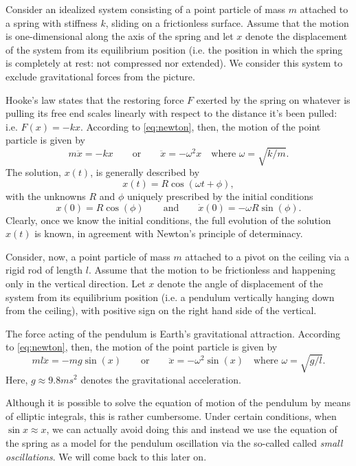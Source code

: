\documentclass[english,fontsize=11pt,paper=a5,oneside]{scrbook}
\theoremstyle{definition}
\newenvironment{example}
  {\pushQED{\qed}\renewcommand{\qedsymbol}{$\lozenge$}\examplex}
  {\popQED\endexamplex}
\begin{document}
\begin{example}[horizontal spring and pendulum]\label{ex:sprPen}

    Consider an idealized system consisting of a point particle of mass $m$ attached to a spring with stiffness $k$, sliding on a frictionless surface.
    Assume that the motion is one-dimensional along the axis of the spring and let $x$ denote the displacement of the system from its equilibrium position (i.e. the position in which the spring is completely at rest: not compressed nor extended). We consider this system to exclude gravitational forces from the picture.
    
    Hooke's law states that the restoring force $F$ exerted by the spring on whatever is pulling its free end scales linearly with respect to the distance it's been pulled: i.e. $F(x) = - k x$. According to \eqref{eq:newton}, then, the motion of the point particle is given by
    \begin{equation}\label{eq:spring}
        m \ddot{x} = - k x \qquad\mbox{or}\qquad \ddot{x} = - \omega^2 x \quad\mbox{where } \omega = \sqrt{k/m}.
    \end{equation}
    The solution, $x(t)$, is generally described by 
    \begin{equation}\label{eq:springsol}
        x(t) = R \cos(\omega t + \phi),
    \end{equation} with the unknowns $R$ and $\phi$ uniquely prescribed by the initial conditions
    \begin{equation}
        x(0) = R\cos(\phi) \qquad\mbox{and}\qquad \dot x(0) = -\omega R \sin(\phi).
    \end{equation}
    Clearly, once we know the initial conditions, the full evolution of the solution $x(t)$ is known, in agreement with Newton's principle of determinacy.
\medskip

    Consider, now, a point particle of mass $m$ attached to a pivot on the ceiling via a rigid rod of length $l$.
    Assume that the motion to be frictionless and happening only in the vertical direction.
    Let $x$ denote the angle of displacement of the system from its equilibrium position (i.e. a pendulum vertically hanging down from the ceiling), with positive sign on the right hand side of the vertical.
    
    The force acting of the pendulum is Earth's gravitational attraction. According to \eqref{eq:newton}, then, the motion of the point particle is given by
    \begin{equation}
        m l \ddot{x} = - m g \sin(x) \qquad\mbox{or}\qquad \ddot{x} = - \omega^2 \sin(x) \quad\mbox{where } \omega = \sqrt{g/l}.
    \end{equation}
    Here, $g \approx 9.8 m s^2$ denotes the gravitational acceleration.
    
    Although it is possible to solve the equation of motion of the pendulum by means of elliptic integrals, this is rather cumbersome.
    Under certain conditions, when $\sin x \approx x$, we can actually avoid doing this and instead we use the equation of the spring as a model for the pendulum oscillation via the so-called called \emph{small oscillations}.
    We will come back to this later on.
\end{example}
\end{document}
